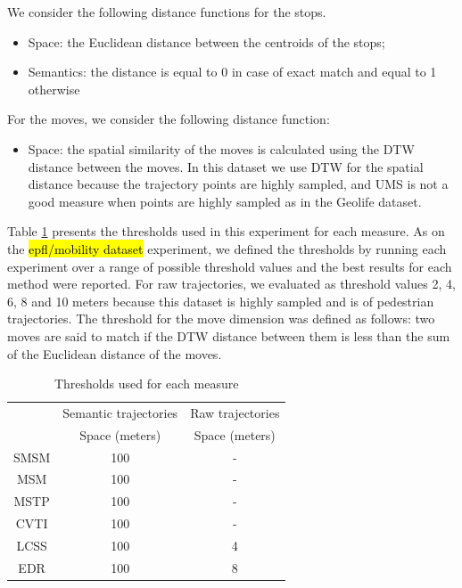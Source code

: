 \documentclass[12pt]{article}
\begin{document}
We consider the following distance functions for the stops.
\begin{itemize}
  \item Space: the Euclidean distance between the centroids of the stops;
  \item Semantics: the distance is equal to 0 in case of exact match and equal to 1 otherwise
\end{itemize}

For the moves, we consider the following distance function:
\begin{itemize}
  \item Space: the spatial similarity of the moves is calculated using the DTW distance between the moves. In this dataset we use DTW for the spatial distance because the trajectory points are highly sampled, and UMS is not a good measure when points are highly sampled as in the Geolife dataset.
\end{itemize}

Table \ref{tab:geolife_thresholds} presents the thresholds used in this experiment for each measure. As on the \hl{epfl/mobility dataset} experiment, we defined the thresholds by running each experiment over a range of possible threshold values and the best results for each method were reported. For raw trajectories, we evaluated as threshold values 2, 4, 6, 8 and 10 meters because this dataset is highly sampled and is of pedestrian trajectories. The threshold for the move dimension was defined as follows: two moves are said to match if the DTW distance between them is less than the sum of the Euclidean distance of the moves.

\begin{table}[!h]
\scriptsize
  \centering
  \begin{tabular}{|c|c|c|}
  	\hline
  & \multicolumn{1}{c|}{Semantic trajectories} & \multicolumn{1}{c|}{Raw trajectories} \\
 	\cline{2-3}
  & Space (meters) & Space (meters) \\
  	\hline
 SMSM & 100 & - \\
 MSM & 100 & - \\
 MSTP & 100 & -  \\
 CVTI & 100 & - \\
 LCSS & 100 & 4 \\
 EDR & 100 & 8 \\
    \hline
  \end{tabular}
  \caption{Thresholds used for each measure}
  \label{tab:geolife_thresholds}
\end{table}
\end{document}
